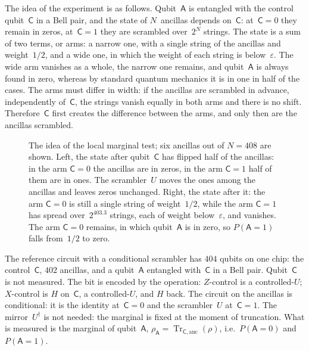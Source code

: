 \documentclass[11pt,a4paper]{article}
\DeclareMathOperator{\Tr}{Tr}
\newcommand{\qC}{\mathsf{C}}
\newcommand{\qA}{\mathsf{A}}
\begin{document}
The idea of the experiment is as follows. Qubit~$\qA$ is entangled with the control qubit~$\qC$ in a Bell pair, and the state of $N$~ancillas depends on~$\qC$: at~$\qC=0$ they remain in zeros, at~$\qC=1$ they are scrambled over~$2^N$ strings. The state is a sum of two terms, or arms: a narrow one, with a single string of the ancillas and weight~$1/2$, and a wide one, in which the weight of each string is below~$\varepsilon$. The wide arm vanishes as a whole, the narrow one remains, and qubit~$\qA$ is always found in zero, whereas by standard quantum mechanics it is in one in half of the cases. The arms must differ in width: if the ancillas are scrambled in advance, independently of~$\qC$, the strings vanish equally in both arms and there is no shift. Therefore~$\qC$ first creates the difference between the arms, and only then are the ancillas scrambled.

\begin{figure}[ht]
\centering

\caption{The idea of the local marginal test; six ancillas out of $N=408$ are shown. Left, the state after qubit~$\qC$ has flipped half of the ancillas: in the arm $\qC=0$ the ancillas are in zeros, in the arm $\qC=1$ half of them are in ones. The scrambler~$U$ moves the ones among the ancillas and leaves zeros unchanged. Right, the state after it: the arm $\qC=0$ is still a single string of weight~$1/2$, while the arm $\qC=1$ has spread over~$2^{403.3}$ strings, each of weight below~$\varepsilon$, and vanishes. The arm $\qC=0$ remains, in which qubit~$\qA$ is in zero, so $P(\qA{=}1)$ falls from~$1/2$ to zero.}
\label{fig:circuit}
\end{figure}

The reference circuit with a conditional scrambler has $404$ qubits on one chip: the control~$\qC$, $402$ ancillas, and a qubit~$\qA$ entangled with~$\qC$ in a Bell pair. Qubit~$\qC$ is not measured. The bit is encoded by the operation: $Z$-control is a controlled-$U$; $X$-control is $H$ on~$\qC$, a controlled-$U$, and $H$ back. The circuit on the ancillas is conditional: it is the identity at~$\qC=0$ and the scrambler~$U$ at~$\qC=1$. The mirror~$U^\dagger$ is not needed: the marginal is fixed at the moment of truncation. What is measured is the marginal of qubit~$\qA$, $\rho_{\qA}=\Tr_{\qC,\mathrm{anc}}(\rho)$, i.e.\ $P(\qA{=}0)$ and $P(\qA{=}1)$.
\end{document}
